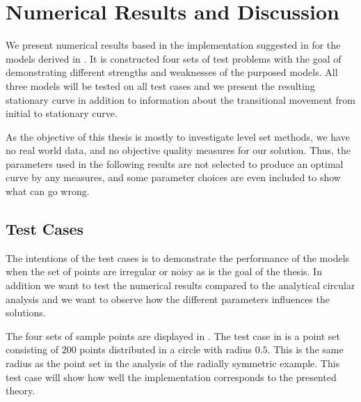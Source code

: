 \chapter{Numerical Results and Discussion} \label{chap:results}
We present numerical results based in the implementation suggested in  for the models derived in . It is constructed four sets of test problems with the goal of demonstrating different strengths and weaknesses of the purposed models. All three models will be tested on all test cases and we present the resulting stationary curve in addition to information about the transitional movement from initial to stationary curve.

As the objective of this thesis is mostly to investigate level set methods, we have no real world data, and no objective quality measures for our solution. Thus, the parameters used in the following results are not selected to produce an optimal curve by any measures, and some parameter choices are even included to show what can go wrong.

\section{Test Cases}
The intentions of the test cases is to demonstrate the performance of the models when the set of points are irregular or noisy as is the goal of the thesis. In addition we want to test the numerical results compared to the analytical circular analysis and we want to observe how the different parameters influences the solutions.

The four sets of sample points are displayed in . The test case in  is a point set consisting of $200$ points distributed in a circle with radius $0.5$. This is the same radius as the point set in the analysis of the radially symmetric example. This test case will show how well the implementation corresponds to the presented theory.

